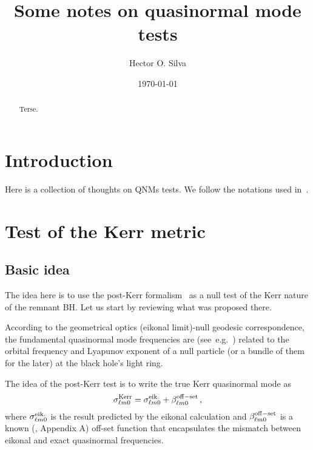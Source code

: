 \documentclass[aps,10pt,preprint,
               notitlepage,onecolumn,superscriptaddress,
               eqsecnum,
               nofootinbib,tightenlines,floatfix]{revtex4-1}
\begin{document}
\title{Some notes on quasinormal mode tests}

\begin{abstract}
Terse.
\end{abstract}

\author{Hector O. Silva}

\date{{\today}}

\maketitle

\tableofcontents

\section{Introduction}

Here is a collection of thoughts on QNMs tests.
%
We follow the notations used in~\cite{Ghosh:2021mrv}.

\section{Test of the Kerr metric}

\subsection{Basic idea}

The idea here is to use the post-Kerr formalism~\cite{Glampedakis:2017dvb} as a null test of
the Kerr nature of the remnant BH.
%
Let us start by reviewing what was proposed there.

According to the geometrical optics (eikonal limit)-null geodesic
correspondence, the fundamental quasinormal mode frequencies are
(see~e.g.~\cite{Ferrari:1984zz,Cardoso:2008bp}) related to the orbital frequency and Lyapunov
exponent of a null particle (or a bundle of them for the later) at the black
hole's light ring.

The idea of the post-Kerr test is to write the true Kerr quasinormal mode as
%
\begin{equation}
    \sigma_{\ell m 0}^{\rm Kerr} = \sigma_{\ell m 0}^{\rm eik.} + \beta_{\ell m 0}^{\rm off-set}\,,
    \label{eq:qnm_kerr_exact}
\end{equation}
%
where $\sigma_{\ell m 0}^{\rm eik.}$ is the result predicted by the eikonal
calculation and $\beta_{\ell m 0}^{\rm off-set}$ is a known
(\cite{Glampedakis:2017dvb}, Appendix A) off-set function that encapsulates the
mismatch between eikonal and exact quasinormal frequencies.
\end{document}
